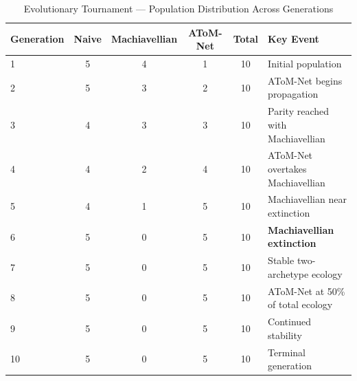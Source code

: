 \documentclass[11pt]{article}
\begin{document}
\begin{table}[!t]
\centering
\small
\setlength{\tabcolsep}{6pt}
\renewcommand{\arraystretch}{1.12}
\caption{Evolutionary Tournament --- Population Distribution Across Generations}
\label{tab:tournament_pop}
\begin{tabularx}{\textwidth}{@{} l c c c c X @{}}
\toprule
\textbf{Generation} & \textbf{Naive} & \textbf{Machiavellian} & \textbf{AToM-Net} &
\textbf{Total} & \textbf{Key Event} \\
\midrule
1  & 5 & 4 & 1  & 10 & Initial population \\
2  & 5 & 3 & 2  & 10 & AToM-Net begins propagation \\
3  & 4 & 3 & 3  & 10 & Parity reached with Machiavellian \\
4  & 4 & 2 & 4  & 10 & AToM-Net overtakes Machiavellian \\
5  & 4 & 1 & 5  & 10 & Machiavellian near extinction \\
6  & 5 & 0 & 5  & 10 & \textbf{Machiavellian extinction} \\
7  & 5 & 0 & 5  & 10 & Stable two-archetype ecology \\
8  & 5 & 0 & 5  & 10 & AToM-Net at 50\% of total ecology \\
9  & 5 & 0 & 5  & 10 & Continued stability \\
10 & 5 & 0 & 5  & 10 & Terminal generation \\
\bottomrule
\end{tabularx}
\end{table}

\end{document}
